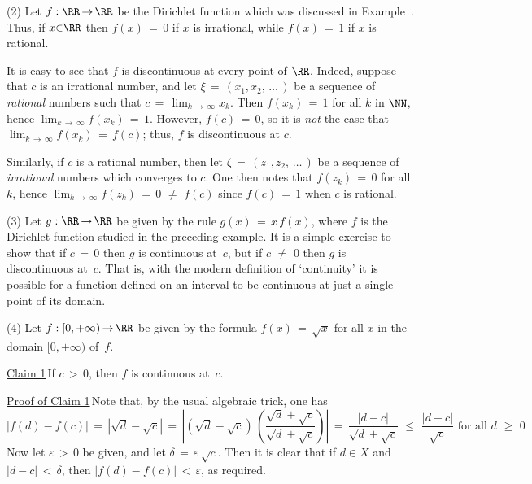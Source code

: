 \V

        (2) Let $f:{\RR} \,{\rightarrow}\, {\RR}$ be the Dirichlet function which was discussed in Example~.
    Thus, if $x{\in}{\RR}$ then $f(x) \,=\, 0$ if $x$ is irrational, while $f(x) \,=\, 1$ if $x$ is rational.

        It is easy to see that $f$ is discontinuous at every point of ${\RR}$.
    Indeed, suppose that $c$ is an irrational number, and let ${\xi} \,=\, (x_{1},x_{2},\,{\ldots}\,)$ be a sequence of {\em rational} numbers such that $c \,=\, \lim_{k \,{\rightarrow}\, {\infty}} x_{k}$.
    Then $f(x_{k}) \,=\, 1$ for all $k$ in ${\NN}$, hence $\lim_{k \,{\rightarrow}\, {\infty}} f(x_{k}) \,=\, 1$.
    However, $f(c) \,=\, 0$, so it is {\em not} the case that $\lim_{k \,{\rightarrow}\, {\infty}} f(x_{k}) \,=\, f(c)$;
    thus, $f$ is discontinuous at $c$.

        Similarly, if $c$ is a rational number, then let ${\zeta} \,=\, (z_{1},z_{2},\,{\ldots}\,)$
    be a sequence of {\em irrational} numbers which converges to $c$.
    One then notes that $f(z_{k}) \,=\, 0$ for all $k$, hence $\lim_{k \,{\rightarrow}\, {\infty}} f(z_{k}) \,=\, 0 \,\,{\neq}\,\, f(c)$
     since $f(c) \,=\, 1$ when $c$ is rational.

\V

        (3) Let $g:{\RR} \,{\rightarrow}\, {\RR}$ be given by the rule $g(x) \,=\, x\,f(x)$,
    where $f$ is the Dirichlet function studied in the preceding example. It is a simple exercise to show that if $c \,=\, 0$ then $g$ is continuous at~$c$,
    but if $c \,\,{\neq}\,\, 0$ then $g$ is discontinuous at~$c$. That is, with the modern definition of `continuity'
    it is possible for a function defined on an interval to be continuous at just a single point of its domain. %

\V

        (4) Let $f:[0,+{\infty}) \,{\rightarrow}\, {\RR}$ be given by the formula $f(x) \,=\, \sqrt{x}$ for all $x$ in the domain $[0,+{\infty})$ of~$f$.

        \underline{Claim 1}\,If $c\,>\,0$, then $f$ is continuous at~$c$.

        \underline{Proof of Claim 1}\,Note that, by the usual algebraic trick, one has
        \begin{displaymath}
        |f(d) - f(c)|
    \,=\,
        |\sqrt{d} - \sqrt{c}|
    \,=\,
        \left|(\sqrt{d} - \sqrt{c})\,
        \left(\frac{\sqrt{d} + \sqrt{c}}{\sqrt{d} + \sqrt{c}}\right)\right|
     \,=\, 
        \frac{|d-c|}{\sqrt{d} + \sqrt{c}}\,\,{\leq}\,\,\frac{|d-c|}{\sqrt{c}} \mbox{ for all $d\,\,{\geq}\,\,0$}
        \end{displaymath}
    Now let ${\varepsilon}\,>\,0$ be given, and let ${\delta} \,=\, {\varepsilon}\,\sqrt{c}$.
    Then it is clear that if $d{\in}X$ and $|d-c|\,<\,{\delta}$, then $|f(d)-f(c)|\,<\,{\varepsilon}$, as required.

